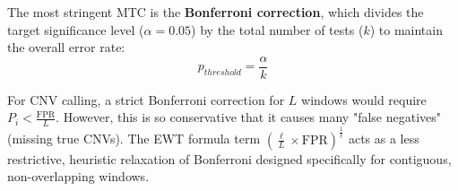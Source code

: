 The most stringent MTC is the \textbf{Bonferroni correction}, which divides the target significance level ($\alpha=0.05$) by the total number of tests ($k$) to maintain the overall error rate:
\[ p_{threshold} = \frac{\alpha}{k} \]

For CNV calling, a strict Bonferroni correction for $L$ windows would require $P_i < \frac{\text{FPR}}{L}$. However, this is so conservative that it causes many "false negatives" (missing true CNVs). The EWT formula term $\left( \frac{\ell}{L} \times \text{FPR} \right)^{\frac{1}{\ell}}$ acts as a less restrictive, heuristic relaxation of Bonferroni designed specifically for contiguous, non-overlapping windows.
